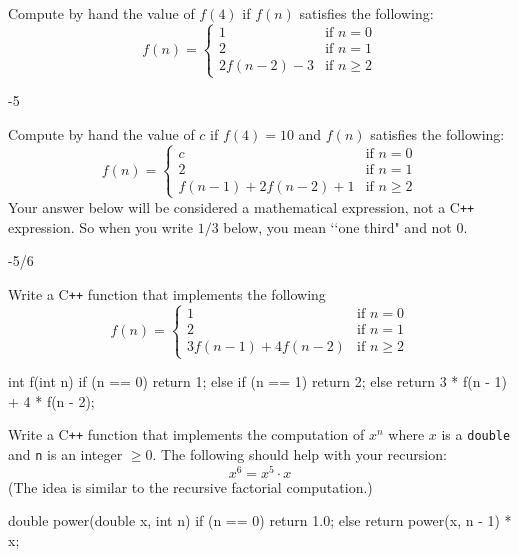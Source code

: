 

\nextq
Compute by hand the value of $f(4)$ if $f(n)$ satisfies the following:
\[
f(n) =
\begin{cases}
1 & \text{if } n = 0 \\
2 & \text{if } n = 1 \\
2 f(n - 2) - 3  & \text{if } n \geq 2
\end{cases}
\]
\ANSWER
\begin{answercode}
-5
\end{answercode}

\nextq
Compute by hand the value of $c$ if $f(4) = 10$
and $f(n)$ satisfies the following:
\[
f(n) =
\begin{cases}
c & \text{if } n = 0 \\
2 & \text{if } n = 1 \\
f(n - 1) + 2 f(n - 2)  + 1  & \text{if } n \geq 2
\end{cases}
\]
Your answer below will be considered a mathematical expression,
not a C\texttt{++} expression.
So when you write $1/3$ below, you mean \lq\lq one third" and not
$0$.
\\
\ANSWER
\begin{answercode}
-5/6
\end{answercode}

\nextq
Write a C\texttt{++} function that implements the following
\[
f(n) =
\begin{cases}
1 & \text{if } n = 0 \\
2 & \text{if } n = 1 \\
3 f(n - 1) + 4 f(n - 2)  & \text{if } n \geq 2
\end{cases}
\]
\ANSWER
\begin{answercode}
int f(int n)
{
  if (n == 0) return 1;
  else if (n == 1) return 2;
  else return 3 * f(n - 1) + 4 * f(n - 2);
}
\end{answercode}

\nextq
Write a C\texttt{++} function that implements the computation of $x^n$ where $x$ is a
\verb!double! and \verb!n! is an integer $\geq 0$.
The following should help with your recursion:
\[
x^{6} = x^{5} \cdot x
\]
(The idea is similar to the recursive factorial computation.)
\\
\ANSWER
\begin{answercode}
double power(double x, int n)
{
  if (n == 0) return 1.0;
  else return power(x, n - 1) * x;
}
\end{answercode}

